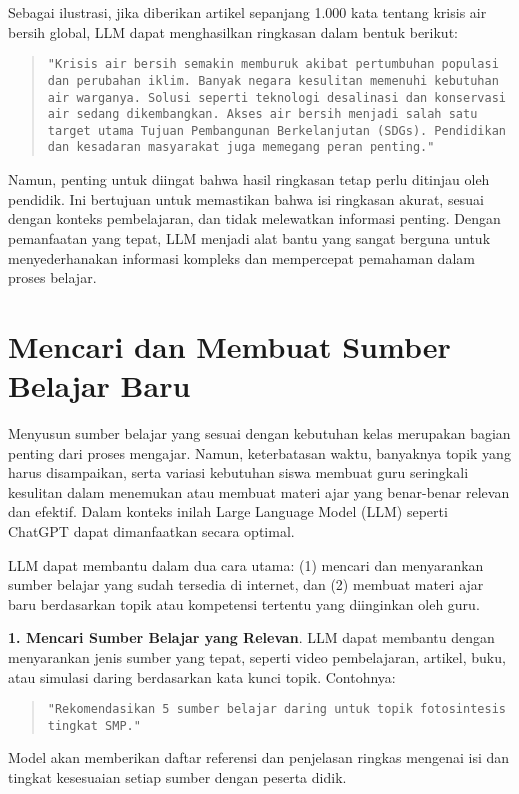 Sebagai ilustrasi, jika diberikan artikel sepanjang 1.000 kata tentang krisis air bersih global, LLM dapat menghasilkan ringkasan dalam bentuk berikut:
\begin{quote}\centering
	\texttt{"Krisis air bersih semakin memburuk akibat pertumbuhan populasi dan perubahan iklim. Banyak negara kesulitan memenuhi kebutuhan air warganya. Solusi seperti teknologi desalinasi dan konservasi air sedang dikembangkan. Akses air bersih menjadi salah satu target utama Tujuan Pembangunan Berkelanjutan (SDGs). Pendidikan dan kesadaran masyarakat juga memegang peran penting."}
\end{quote}

Namun, penting untuk diingat bahwa hasil ringkasan tetap perlu ditinjau oleh pendidik. Ini bertujuan untuk memastikan bahwa isi ringkasan akurat, sesuai dengan konteks pembelajaran, dan tidak melewatkan informasi penting. Dengan pemanfaatan yang tepat, LLM menjadi alat bantu yang sangat berguna untuk menyederhanakan informasi kompleks dan mempercepat pemahaman dalam proses belajar.

\section{Mencari dan Membuat Sumber Belajar Baru}

Menyusun sumber belajar yang sesuai dengan kebutuhan kelas merupakan bagian penting dari proses mengajar. Namun, keterbatasan waktu, banyaknya topik yang harus disampaikan, serta variasi kebutuhan siswa membuat guru seringkali kesulitan dalam menemukan atau membuat materi ajar yang benar-benar relevan dan efektif. Dalam konteks inilah Large Language Model (LLM) seperti ChatGPT dapat dimanfaatkan secara optimal.

LLM dapat membantu dalam dua cara utama: 
(1) mencari dan menyarankan sumber belajar yang sudah tersedia di internet, dan  
(2) membuat materi ajar baru berdasarkan topik atau kompetensi tertentu yang diinginkan oleh guru.

\textbf{1. Mencari Sumber Belajar yang Relevan}.  
LLM dapat membantu dengan menyarankan jenis sumber yang tepat, seperti video pembelajaran, artikel, buku, atau simulasi daring berdasarkan kata kunci topik. Contohnya:

\begin{quote}
	\centering
	\texttt{"Rekomendasikan 5 sumber belajar daring untuk topik fotosintesis tingkat SMP."}
\end{quote}

Model akan memberikan daftar referensi dan penjelasan ringkas mengenai isi dan tingkat kesesuaian setiap sumber dengan peserta didik.

